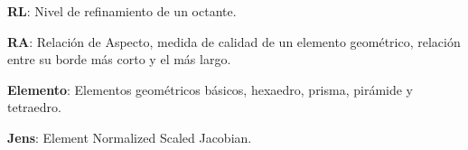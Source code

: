 
{\setlength{\parskip}{0cm} %


\textbf{RL}: Nivel de refinamiento de un octante.

\textbf{RA}: Relación de Aspecto, medida de calidad de un elemento geométrico, relación entre su borde más corto y el más largo.
}
\textbf{Elemento}: Elementos geométricos básicos, hexaedro, prisma, pirámide y tetraedro.

\textbf{Jens}: Element Normalized Scaled Jacobian.
